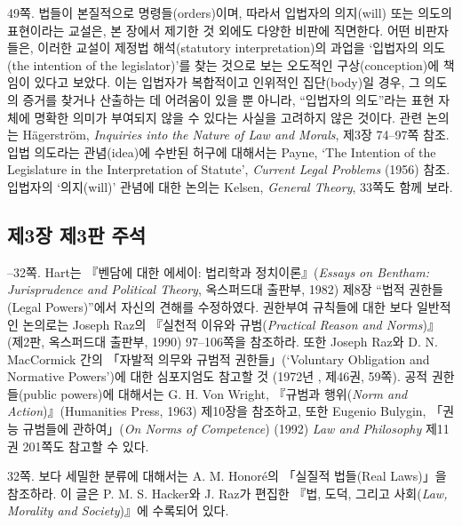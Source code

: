 {\noteentry 49쪽.  법들이 본질적으로 명령들(orders)이며, 따라서 입법자의
의지(will) 또는 의도의 표현이라는 교설은, 본 장에서 제기한 것 외에도
다양한 비판에 직면한다. 어떤 비판자들은, 이러한 교설이 제정법
해석(statutory interpretation)의 과업을 ‘입법자의 의도(the intention of
the legislator)’를 찾는 것으로 보는 오도적인 구상(conception)에 책임이
있다고 보았다. 이는 입법자가 복합적이고 인위적인 집단(body)일 경우, 그
의도의 증거를 찾거나 산출하는 데 어려움이 있을 뿐 아니라, “입법자의
의도”라는 표현 자체에 명확한 의미가 부여되지 않을 수 있다는 사실을
고려하지 않은 것이다. 관련 논의는 Hägerström, \emph{Inquiries into the
Nature of Law and Morals}, 제3장 74--97쪽 참조. 입법 의도라는
관념(idea)에 수반된 허구에 대해서는 Payne, `The Intention of the
Legislature in the Interpretation of Statute', \emph{Current Legal
Problems} (1956) 참조. 입법자의 ‘의지(will)’ 관념에 대한 논의는 Kelsen,
\emph{General Theory}, 33쪽도 함께 보라.

\subsection{제3장 제3판
주석}\label{uxc81c3uxc7a5-uxc81c3uxd310-uxc8fcuxc11d}

--32쪽.  Hart는
『벤담에 대한 에세이: 법리학과 정치이론』(\emph{Essays on Bentham:
Jurisprudence and Political Theory}, 옥스퍼드대 출판부, 1982) 제8장
“법적 권한들(Legal Powers)”에서 자신의 견해를 수정하였다. 권한부여
규칙들에 대한 보다 일반적인 논의로는 Joseph Raz의 『실천적 이유와
규범(\emph{Practical Reason and Norms})』(제2판, 옥스퍼드대 출판부,
1990) 97--106쪽을 참조하라. 또한 Joseph Raz와 D. N. MacCormick 간의
「자발적 의무와 규범적 권한들」(`Voluntary Obligation and Normative
Powers')에 대한 심포지엄도 참고할 것 (1972년 , 제46권, 59쪽). 공적 권한들(public powers)에 대해서는 G. H.
Von Wright, 『규범과 행위(\emph{Norm and Action})』(Humanities Press,
1963) 제10장을 참조하고, 또한 Eugenio Bulygin, 「권능 규범들에
관하여」(\emph{On Norms of Competence}) (1992) \emph{Law and Philosophy}
제11권 201쪽도 참고할 수 있다.

\noteentry 32쪽.  보다 세밀한 분류에
대해서는 A. M. Honoré의 「실질적 법들(Real Laws)」을 참조하라. 이 글은
P. M. S. Hacker와 J. Raz가 편집한 『법, 도덕, 그리고 사회(\emph{Law,
Morality and Society})』에 수록되어 있다.

}
